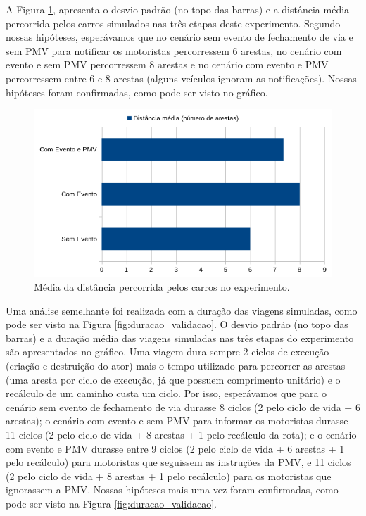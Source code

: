 A Figura \ref{fig:distancia_validacao}, apresenta o desvio padrão (no topo das barras) e a distância média percorrida pelos carros simulados nas três etapas deste experimento.
Segundo nossas hipóteses, esperávamos que no cenário sem evento de fechamento de via e sem PMV para notificar os motoristas percorressem 6 arestas, no cenário com evento e sem PMV percorressem 8 arestas
e no cenário com evento e PMV percorressem entre 6 e 8 arestas (alguns veículos ignoram as notificações).
Nossas hipóteses foram confirmadas, como pode ser visto no gráfico.

\begin{figure}[ht]
	\centering
	\includegraphics[width=\textwidth]{figuras/distancia_validacao.png}
	\caption{Média da distância percorrida pelos carros no experimento.}
	\label{fig:distancia_validacao}
\end{figure}

Uma análise semelhante foi realizada com a duração das viagens simuladas, como pode ser visto na Figura \ref{fig:duracao_validacao}.
O desvio padrão (no topo das barras) e a duração média das viagens simuladas nas três etapas do experimento são apresentados no gráfico.
Uma viagem dura sempre 2 ciclos de execução (criação e destruição do ator) mais o tempo utilizado para percorrer as arestas (uma aresta por ciclo de execução, já que possuem comprimento unitário)
e o recálculo de um caminho custa um ciclo.
Por isso, esperávamos que para o cenário sem evento de fechamento de via durasse 8 ciclos (2 pelo ciclo de vida + 6 arestas);
o cenário com evento e sem PMV para informar os motoristas durasse 11 ciclos (2 pelo ciclo de vida + 8 arestas + 1 pelo recálculo da rota);
e o cenário com evento e PMV durasse entre 9 ciclos (2 pelo ciclo de vida + 6 arestas + 1 pelo recálculo) para motoristas que seguissem as instruções da PMV, e 11 ciclos (2 pelo ciclo de vida + 8 arestas +
1 pelo recálculo) para os motoristas que ignorassem a PMV.
Nossas hipóteses mais uma vez foram confirmadas, como pode ser visto na Figura \ref{fig:duracao_validacao}.

